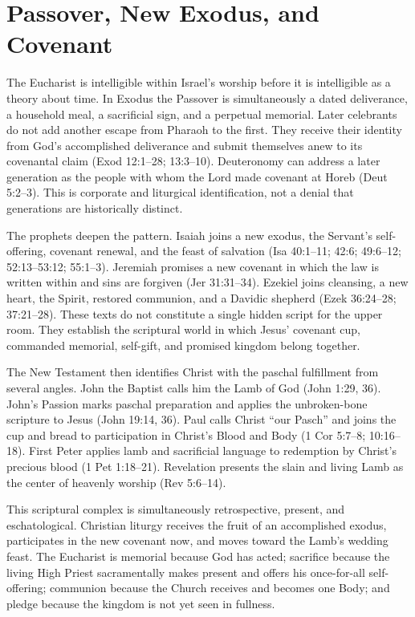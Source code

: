 \section{Passover, New Exodus, and Covenant}

The Eucharist is intelligible within Israel's worship before it is intelligible
as a theory about time. In Exodus the Passover is simultaneously a dated
deliverance, a household meal, a sacrificial sign, and a perpetual memorial.
Later celebrants do not add another escape from Pharaoh to the first. They
receive their identity from God's accomplished deliverance and submit
themselves anew to its covenantal claim (Exod 12:1--28; 13:3--10). Deuteronomy
can address a later generation as the people with whom the Lord made covenant
at Horeb (Deut 5:2--3). This is corporate and liturgical identification, not a
denial that generations are historically distinct.

The prophets deepen the pattern. Isaiah joins a new exodus, the Servant's
self-offering, covenant renewal, and the feast of salvation (Isa 40:1--11;
42:6; 49:6--12; 52:13--53:12; 55:1--3). Jeremiah promises a new covenant in
which the law is written within and sins are forgiven (Jer 31:31--34).
Ezekiel joins cleansing, a new heart, the Spirit, restored communion, and a
Davidic shepherd (Ezek 36:24--28; 37:21--28). These texts do not constitute a
single hidden script for the upper room. They establish the scriptural world
in which Jesus' covenant cup, commanded memorial, self-gift, and promised
kingdom belong together.

The New Testament then identifies Christ with the paschal fulfillment from
several angles. John the Baptist calls him the Lamb of God (John 1:29, 36).
John's Passion marks paschal preparation and applies the unbroken-bone
scripture to Jesus (John 19:14, 36). Paul calls Christ ``our Pasch'' and joins
the cup and bread to participation in Christ's Blood and Body (1 Cor 5:7--8;
10:16--18). First Peter applies lamb and sacrificial language to redemption
by Christ's precious blood (1 Pet 1:18--21). Revelation presents the slain and
living Lamb as the center of heavenly worship (Rev 5:6--14).

This scriptural complex is simultaneously retrospective, present, and
eschatological. Christian liturgy receives the
fruit of an accomplished exodus, participates in the new covenant now, and
moves toward the Lamb's wedding feast. The Eucharist is memorial because God
has acted; sacrifice because the living High Priest sacramentally makes present
and offers his once-for-all self-offering; communion
because the Church receives and becomes one Body; and pledge because the
kingdom is not yet seen in fullness.

